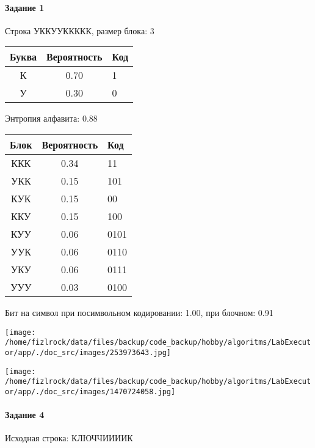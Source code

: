\documentclass[a4paper, 12pt]{article}
\begin{document}
\paragraph{Задание 1}

Строка УККУУККККК, размер блока: 3
\begin{center}
 \begin{tabular}{ |c|c|l| } 
  \hline
     Буква & Вероятность & Код\\ \hline
К & 0.70 & 1\\\hline
У & 0.30 & 0
\\ \hline \end{tabular}
\end{center}
Энтропия алфавита: 0.88
\begin{center}
 \begin{tabular}{ |c|c|l| } 
  \hline
     Блок & Вероятность & Код\\ \hline
ККК & 0.34 & 11\\\hline
УКК & 0.15 & 101\\\hline
КУК & 0.15 & 00\\\hline
ККУ & 0.15 & 100\\\hline
КУУ & 0.06 & 0101\\\hline
УУК & 0.06 & 0110\\\hline
УКУ & 0.06 & 0111\\\hline
УУУ & 0.03 & 0100
\\ \hline \end{tabular}
\end{center}
Бит на символ при посимвольном кодировании: 1.00, при блочном: 0.91

\texttt{[image: /home/fizlrock/data/files/backup/code\_backup/hobby/algoritms/LabExecutor/app/./doc\_src/images/253973643.jpg]}

\texttt{[image: /home/fizlrock/data/files/backup/code\_backup/hobby/algoritms/LabExecutor/app/./doc\_src/images/1470724058.jpg]}
\paragraph{Задание 4}


Исходная строка: КЛЮЧЧИИИИК
\end{document}
